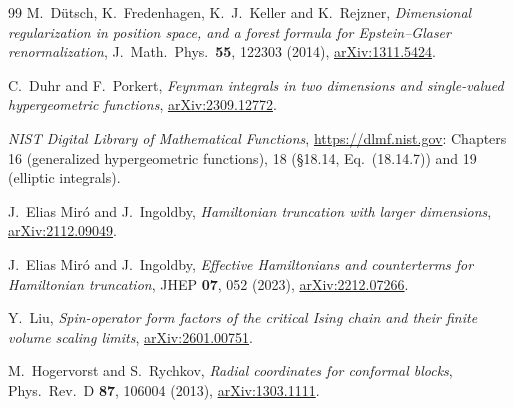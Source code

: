 \documentclass[11pt,a4paper]{article}
\numberwithin{equation}{section}
\begin{document}
\begin{thebibliography}{99}
M.~D\"utsch, K.~Fredenhagen, K.~J.~Keller and K.~Rejzner,
\emph{Dimensional regularization in position space, and a forest formula for Epstein--Glaser renormalization},
J.\ Math.\ Phys.\ \textbf{55}, 122303 (2014),
\href{https://arxiv.org/abs/1311.5424}{arXiv:1311.5424}.

C.~Duhr and F.~Porkert,
\emph{Feynman integrals in two dimensions and single-valued hypergeometric functions},
\href{https://arxiv.org/abs/2309.12772}{arXiv:2309.12772}.

\emph{NIST Digital Library of Mathematical Functions}, \url{https://dlmf.nist.gov}: Chapters 16 (generalized hypergeometric functions), 18 (\S18.14, Eq.~(18.14.7)) and 19 (elliptic integrals).

J.~Elias Mir\'o and J.~Ingoldby,
\emph{Hamiltonian truncation with larger dimensions},
\href{https://arxiv.org/abs/2112.09049}{arXiv:2112.09049}.

J.~Elias Mir\'o and J.~Ingoldby,
\emph{Effective Hamiltonians and counterterms for Hamiltonian truncation},
JHEP \textbf{07}, 052 (2023),
\href{https://arxiv.org/abs/2212.07266}{arXiv:2212.07266}.

Y.~Liu,
\emph{Spin-operator form factors of the critical Ising chain and their finite volume scaling limits},
\href{https://arxiv.org/abs/2601.00751}{arXiv:2601.00751}.

M.~Hogervorst and S.~Rychkov,
\emph{Radial coordinates for conformal blocks},
Phys.\ Rev.\ D \textbf{87}, 106004 (2013),
\href{https://arxiv.org/abs/1303.1111}{arXiv:1303.1111}.
\end{thebibliography}
\end{document}
